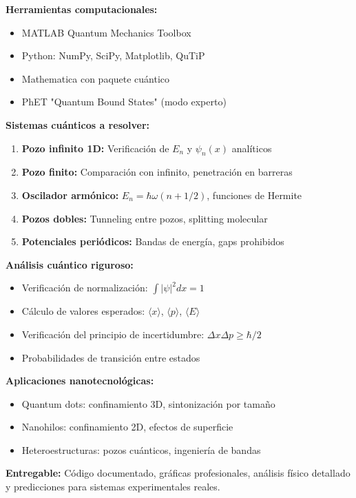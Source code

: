 \begin{tecnologiabox}
\begin{tecnologiabox}
\begin{tecnologiabox}
\begin{practicabox}
	\textbf{Herramientas computacionales:}
	\begin{itemize}
		\item MATLAB Quantum Mechanics Toolbox
		\item Python: NumPy, SciPy, Matplotlib, QuTiP
		\item Mathematica con paquete cuántico
		\item PhET "Quantum Bound States" (modo experto)
	\end{itemize}
	
	\textbf{Sistemas cuánticos a resolver:}
	\begin{enumerate}
		\item \textbf{Pozo infinito 1D:} Verificación de $E_n$ y $\psi_n(x)$ analíticos
		\item \textbf{Pozo finito:} Comparación con infinito, penetración en barreras  
		\item \textbf{Oscilador armónico:} $E_n = \hbar\omega(n + 1/2)$, funciones de Hermite
		\item \textbf{Pozos dobles:} Tunneling entre pozos, splitting molecular
		\item \textbf{Potenciales periódicos:} Bandas de energía, gaps prohibidos
	\end{enumerate}
	
	\textbf{Análisis cuántico riguroso:}
	\begin{itemize}
		\item Verificación de normalización: $\int |\psi|^2 dx = 1$
		\item Cálculo de valores esperados: $\langle x \rangle$, $\langle p \rangle$, $\langle E \rangle$
		\item Verificación del principio de incertidumbre: $\Delta x \Delta p \geq \hbar/2$
		\item Probabilidades de transición entre estados
	\end{itemize}
	
	\textbf{Aplicaciones nanotecnológicas:}
	\begin{itemize}
		\item Quantum dots: confinamiento 3D, sintonización por tamaño
		\item Nanohilos: confinamiento 2D, efectos de superficie
		\item Heteroestructuras: pozos cuánticos, ingeniería de bandas
	\end{itemize}
	
	\textbf{Entregable:} Código documentado, gráficas profesionales, análisis físico detallado y predicciones para sistemas experimentales reales.
\end{practicabox}


\end{tecnologiabox}
\end{tecnologiabox}
\end{tecnologiabox}
